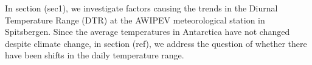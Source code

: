 In section (sec1), we investigate factors causing the trends in the Diurnal Temperature Range (DTR) at the AWIPEV meteorological station in Spitsbergen. Since the average temperatures in Antarctica have not changed despite climate change, in section (ref), we address the question of whether there have been shifts in the daily temperature range.